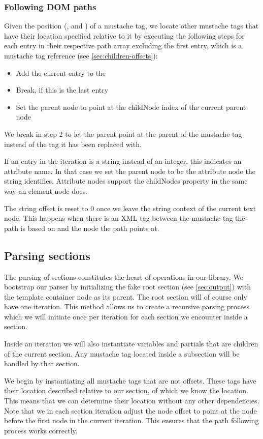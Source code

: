 \documentclass[thesis.tex]{subfiles}
\begin{document}
\subsubsection{Following DOM paths}
Given the position (,  and )
of a mustache tag, we locate other mustache tags that have their location
specified relative to it by executing the following steps for each entry in
their respective path array
excluding the first entry, which is a mustache tag reference
(see \ref{sec:children-offsets}):
\begin{itemize}
\item Add the current entry to the 
\item Break, if this is the last entry
\item Set the parent node to point at the childNode index  of
      the current parent node
\end{itemize}
We break in step 2 to let the parent point at the parent of the mustache tag
instead of the tag it has been replaced with.

If an entry in the iteration is a string instead of an integer, this indicates
an attribute name. In that case we set the parent node to be the attribute node
the string identifies.
Attribute nodes support the childNodes property in the same way an element node
does.

The string offset is reset to 0 once we leave the string context of the
current text node. This happens when there is an XML tag between the
mustache tag the path is based on and the node the path points at.

\subsection{Parsing sections}
The parsing of sections constitutes the heart of operations in our library.
We bootstrap our parser by initializing the fake root section
(see \ref{sec:output}) with the template container node as its parent.
The root section will of course only have one iteration.
This method allows us to create a recursive parsing process which we will
initiate once per iteration for each section we encounter inside a section.

Inside an iteration we will also instantiate variables and partials that are
children of the current section. Any mustache tag located inside a subsection
will be handled by that section.

We begin by instantiating all mustache tags that are not offsets. These
tags have their location described relative to our section, of which we know the
location. This means that we can determine their location without any other
dependencies.
Note that we in each section iteration adjust the node offset
to point at the node before the first node in the current iteration.
This ensures that the path following process works correctly.
\end{document}
